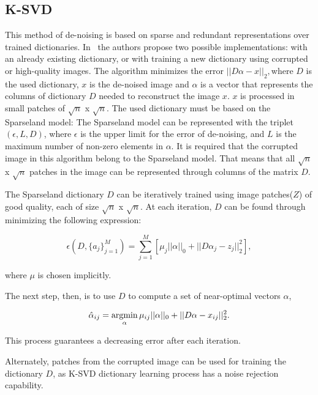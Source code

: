 \subsection{K-SVD} \label{sc:description-ksvd}
This method of de-noising is based on sparse and redundant representations over trained dictionaries. In~\cite{ksvd} the authors propose two possible implementations: with an already existing dictionary, or with training a new dictionary using corrupted or high-quality images. The algorithm minimizes the error $||D\alpha-x||_{2}, $where $D$ is the used dictionary, $x$ is the de-noised image and $\alpha$ is a vector that represents the columns of dictionary $D$ needed to reconstruct the image $x$. $x$ is processed in small patches of $\sqrt{n}$ x $\sqrt{n}$. The used dictionary must be based on the Sparseland model: The Sparseland model can be represented with the triplet $(\epsilon,L,D)$, where $\epsilon$ is the upper limit for the error of de-noising, and $L$ is the maximum number of non-zero elements in $\alpha$. It is required that the corrupted image in this algorithm belong to the Sparseland model. That means that all $\sqrt{n}$ x $\sqrt{n}$ patches in the image can be represented through columns of the matrix $D$.

The Sparseland dictionary $D$ can be iteratively trained using image patches($Z$) of good quality, each of size $\sqrt{n}$ x $\sqrt{n}$. At each iteration, $D$ can be found through minimizing the following expression:

\begin{equation}
    \epsilon(D,\{a_{j}\}_{j=1}^{M})=\displaystyle \sum_{j=1}^{M}[\mu_{j}||\alpha||_{0}+||D\alpha_{j}-z_{j}||_{2}^{2}],
    \label{eq:ksvd_1}
\end{equation}

where $\mu$ is chosen implicitly. 

The next step, then, is to use $D$ to compute a set of near-optimal vectors $\alpha$,

\begin{equation}
    \hat{\alpha}_{ij}=\operatorname*{argmin}\limits_\alpha \mu_{ij}||\alpha||_{0}+||D\alpha-x_{ij}||_{2}^{2}.
    \label{eq:ksvd_2}
\end{equation}

This process guarantees a decreasing error after each iteration. 

Alternately, patches from the corrupted image can be used for training the dictionary $D$, as K-SVD dictionary learning process has a noise rejection capability.

